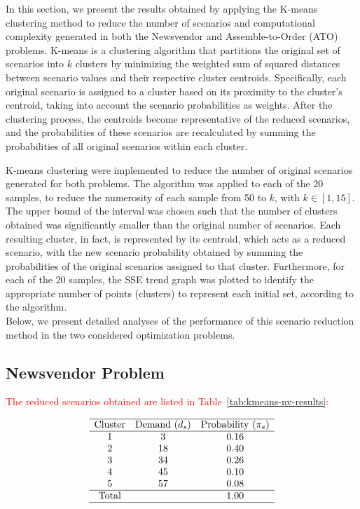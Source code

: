 \documentclass[a4paper,12pt]{article}
\begin{document}
	In this section, we present the results obtained by applying the K-means clustering method to reduce the number of scenarios and computational complexity generated in both the Newsvendor and Assemble-to-Order (ATO) problems. K-means is a clustering algorithm that partitions the original set of scenarios into \(k\) clusters by minimizing the weighted sum of squared distances between scenario values and their respective cluster centroids. Specifically, each original scenario is assigned to a cluster based on its proximity to the cluster's centroid, taking into account the scenario probabilities as weights. After the clustering process, the centroids become representative of the reduced scenarios, and the probabilities of these scenarios are recalculated by summing the probabilities of all original scenarios within each cluster.
	
	\noindent K-means clustering were implemented to reduce the number of original scenarios generated for both problems. The algorithm was applied to each of the 20 samples, to reduce the numerosity of each sample from 50 to $k$, with $k \in [1,15]$. The upper bound of the interval was chosen such that the number of clusters obtained was significantly smaller than the original number of scenarios. Each resulting cluster, in fact, is represented by its centroid, which acts as a reduced scenario, with the new scenario probability obtained by summing the probabilities of the original scenarios assigned to that cluster. Furthermore, for each of the 20 samples, the SSE trend graph was plotted to identify the appropriate number of points (clusters) to represent each initial set, according to the algorithm.\\
	
	\noindent Below, we present detailed analyses of the performance of this scenario reduction method in the two considered optimization problems.
	
	\subsection{Newsvendor Problem}
	
	
	
	\textcolor{red}{The reduced scenarios obtained are listed in Table~\ref{tab:kmeans-nv-results}:}
	
	\[
	\begin{array}{ccc}
		\hline
		\text{Cluster} & \text{Demand ($d_{s}$)} & \text{Probability (\(\pi_{s}\))} \\
		\hline
		1 & 3 & 0.16 \\
		2 & 18 & 0.40 \\
		3 & 34 & 0.26 \\
		4 & 45 & 0.10 \\
		5 & 57 & 0.08 \\
		\hline
		\text{Total} & & 1.00 \\
		\hline
	\end{array}
	\]
	\label{tab:kmeans-nv-results}
	
\end{document}
